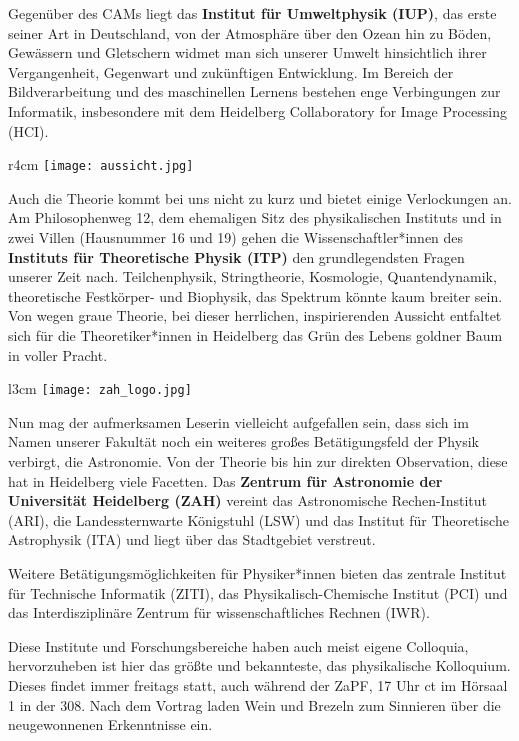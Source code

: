 Gegenüber des CAMs liegt das \textbf{Institut für Umweltphysik (IUP)}, das erste seiner Art in Deutschland, von der Atmosphäre über den Ozean hin zu Böden, Gewässern und Gletschern widmet man sich unserer Umwelt hinsichtlich ihrer Vergangenheit, Gegenwart und zukünftigen Entwicklung. Im Bereich der Bildverarbeitung und des maschinellen Lernens bestehen enge Verbingungen zur Informatik, insbesondere mit dem Heidelberg Collaboratory for Image Processing (HCI).

\begin{wrapfigure}{r}{4cm}
\texttt{[image: aussicht.jpg]}
\end{wrapfigure}

Auch die Theorie kommt bei uns nicht zu kurz und bietet einige Verlockungen an. Am Philosophenweg 12, dem ehemaligen Sitz des physikalischen Instituts und in zwei Villen (Hausnummer 16 und 19) gehen die Wissenschaftler*innen des \textbf{Instituts für Theoretische Physik (ITP)} den grundlegendsten Fragen unserer Zeit nach. Teilchenphysik, Stringtheorie, Kosmologie, Quantendynamik, theoretische Festkörper- und Biophysik, das Spektrum könnte kaum breiter sein. Von wegen graue Theorie, bei dieser herrlichen, inspirierenden Aussicht entfaltet sich für die Theoretiker*innen in Heidelberg das Grün des Lebens goldner Baum in voller Pracht.
\begin{wrapfigure}{l}{3cm}
\texttt{[image: zah\_logo.jpg]}
\end{wrapfigure}

Nun mag der aufmerksamen Leserin vielleicht aufgefallen sein, dass sich im Namen unserer Fakultät noch ein weiteres großes Betätigungsfeld der Physik verbirgt, die Astronomie. Von der Theorie bis hin zur direkten Observation, diese hat in Heidelberg viele Facetten.
Das \textbf{Zentrum für Astronomie der Universität Heidelberg (ZAH)} vereint das
Astronomische Rechen-Institut (ARI), die Landessternwarte Königstuhl (LSW) und das Institut für Theoretische Astrophysik (ITA) und liegt über das Stadtgebiet verstreut. 

Weitere Betätigungsmöglichkeiten für Physiker*innen bieten das zentrale Institut für Technische Informatik (ZITI), das Physikalisch-Chemische Institut (PCI) und das Interdisziplinäre Zentrum für wissenschaftliches Rechnen (IWR).

Diese Institute und Forschungsbereiche haben auch meist eigene Colloquia, hervorzuheben ist hier das größte und bekannteste, das physikalische Kolloquium. Dieses findet immer freitags statt, auch während der ZaPF, 17 Uhr ct im Hörsaal 1 in der 308. Nach dem Vortrag laden Wein und Brezeln zum Sinnieren über die neugewonnenen Erkenntnisse ein.

